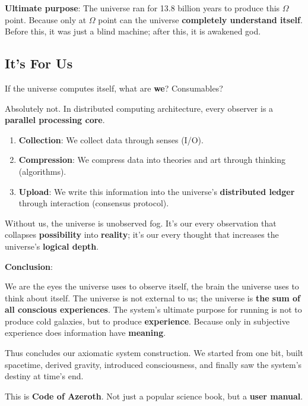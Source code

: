 \textbf{Ultimate purpose}:
The universe ran for 13.8 billion years to produce this $\Omega$ point.
Because only at $\Omega$ point can the universe \textbf{completely understand itself}.
Before this, it was just a blind machine; after this, it is awakened god.

\subsection{It's For Us}

If the universe computes itself, what are \textbf{we}? Consumables?

Absolutely not. In distributed computing architecture, every observer is a \textbf{parallel processing core}.

\begin{enumerate}
\item \textbf{Collection}: We collect data through senses (I/O).
\item \textbf{Compression}: We compress data into theories and art through thinking (algorithms).
\item \textbf{Upload}: We write this information into the universe's \textbf{distributed ledger} through interaction (consensus protocol).
\end{enumerate}

Without us, the universe is unobserved fog.
It's our every observation that collapses \textbf{possibility} into \textbf{reality}; it's our every thought that increases the universe's \textbf{logical depth}.

\textbf{Conclusion}:

We are the eyes the universe uses to observe itself, the brain the universe uses to think about itself.
The universe is not external to us; the universe is \textbf{the sum of all conscious experiences}.
The system's ultimate purpose for running is not to produce cold galaxies, but to produce \textbf{experience}. Because only in subjective experience does information have \textbf{meaning}.

Thus concludes our axiomatic system construction.
We started from one bit, built spacetime, derived gravity, introduced consciousness, and finally saw the system's destiny at time's end.

This is \textbf{Code of Azeroth}. Not just a popular science book, but a \textbf{user manual}.
